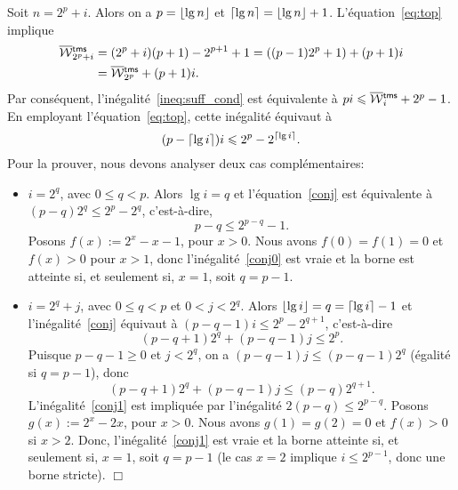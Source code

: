 Soit \(n = 2^p + i\). Alors on a \(p = \lfloor{\lg n}\rfloor\) et
\(\lceil{\lg n}\rceil = \lfloor{\lg n}\rfloor + 1\). L'équation~\eqref{eq:top}
 implique
\begin{align*}
\OW{\fun{tms}}{2^p+i} &=
(2^p+i)(p+1)-2^{p+1}+1 = ((p-1)2^p+1)+(p+1)i\\
&= \OW{\fun{tms}}{2^p} + (p+1)i.
\end{align*}
Par conséquent, l'inégalité~\eqref{ineq:suff_cond} est équivalente à
\(pi \leqslant \OW{\fun{tms}}{i} + 2^p - 1\). En employant
l'équation~\eqref{eq:top}, cette inégalité équivaut à
\begin{equation}
  (p - \lceil{\lg i}\rceil)i \leqslant 2^p - 2^{\lceil{\lg i}\rceil}.
\label{conj}
\end{equation}
Pour la prouver, nous devons analyser deux cas complémentaires:
\begin{itemize}

  \item \(i=2^q\), avec \(0 \leqslant q < p\). Alors \(\lg i = q\) et
    l'équation~\eqref{conj} est équivalente à \((p-q)2^q \leqslant 2^p
    - 2^q\), c'est-à-dire,
    \begin{equation}
      p-q \leqslant 2^{p-q} - 1.\label{conj0}
    \end{equation}
    Posons \(f(x) := 2^x - x - 1\), pour \(x > 0\). Nous avons \(f(0)
    = f(1) = 0\) et \(f(x) > 0\) pour \(x>1\), donc
    l'inégalité~\eqref{conj0} est vraie et la borne est atteinte si,
    et seulement si, \(x=1\), soit \(q=p-1\).

  \item \(i = 2^q + j\), avec \(0 \leqslant q < p\) et \(0 < j <
    2^q\). Alors \(\lfloor{\lg i}\rfloor = q = \lceil{\lg i}\rceil - 1\) et
    l'inégalité~\eqref{conj} équivaut à \((p-q-1)i \leqslant 2^p -
    2^{q+1}\), c'est-à-dire
  \begin{equation}
    (p-q+1)2^q + (p-q-1)j \leqslant 2^p.\label{conj1}
  \end{equation}
  Puisque \(p-q-1 \geqslant 0\) et \(j < 2^q\), on a \((p-q-1)j
  \leqslant (p-q-1)2^q\) (égalité si \(q=p-1\)), donc
  \begin{equation*}
    (p-q+1)2^q+(p-q-1)j \leqslant (p-q)2^{q+1}.
  \end{equation*}
  L'inégalité~\eqref{conj1} est impliquée par l'inégalité \(2(p-q)
  \leqslant 2^{p-q}\). Posons \(g(x) := 2^x - 2x\), pour \(x>0\). Nous
  avons \(g(1) = g(2) = 0\) et \(f(x) > 0\) si \(x > 2\). Donc,
  l'inégalité~\eqref{conj1} est vraie et la borne atteinte si, et
  seulement si, \(x=1\), soit \(q = p -1\) (le cas \(x = 2\) implique
  \(i \leqslant 2^{p-1}\), donc une borne stricte). \hfill\(\Box\)

\end{itemize}

